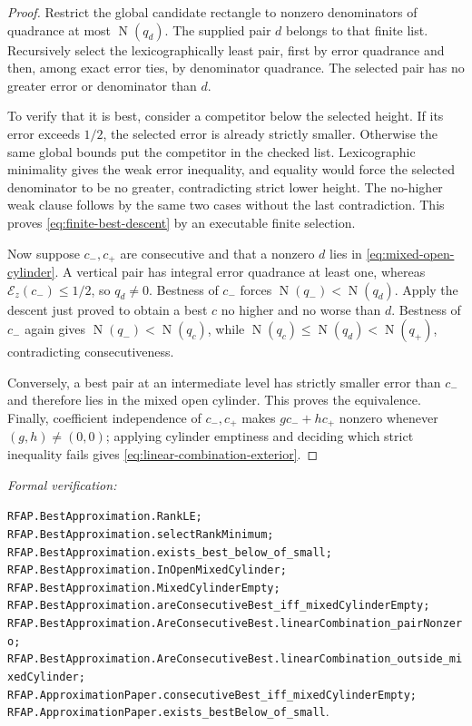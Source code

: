 \documentclass[11pt]{article}
\newcommand{\Norm}[1]{\operatorname{N}\!\left(#1\right)}
\newcommand{\leanref}[1]{\par\smallskip\noindent
  \emph{Formal verification:}\par\nobreak
  {\raggedright\nolinkurl{#1}.\par}}
\begin{document}
\begin{proof}
Restrict the global candidate rectangle to nonzero denominators of quadrance
at most $\Norm{q_d}$.  The supplied pair $d$ belongs to that finite list.
Recursively select the lexicographically least pair, first by error quadrance
and then, among exact error ties, by denominator quadrance.  The selected pair
has no greater error or denominator than $d$.

To verify that it is best, consider a competitor below the selected height.
If its error exceeds $1/2$, the selected error is already strictly smaller.
Otherwise the same global bounds put the competitor in the checked list.
Lexicographic minimality gives the weak error inequality, and equality would
force the selected denominator to be no greater, contradicting strict lower
height.  The no-higher weak clause follows by the same two cases without the
last contradiction.  This proves \eqref{eq:finite-best-descent} by an
executable finite selection.

Now suppose $c_-,c_+$ are consecutive and that a nonzero $d$ lies in
\eqref{eq:mixed-open-cylinder}.  A vertical pair has integral error quadrance
at least one, whereas $\mathcal E_z(c_-)\le1/2$, so $q_d\ne0$.  Bestness of
$c_-$ forces $\Norm{q_-}<\Norm{q_d}$.  Apply the descent just proved to obtain
a best $c$ no higher and no worse than $d$.  Bestness of $c_-$ again gives
$\Norm{q_-}<\Norm{q_c}$, while
$\Norm{q_c}\le\Norm{q_d}<\Norm{q_+}$, contradicting consecutiveness.

Conversely, a best pair at an intermediate level has strictly smaller error
than $c_-$ and therefore lies in the mixed open cylinder.  This proves the
equivalence.  Finally, coefficient independence of $c_-,c_+$ makes
$gc_-+hc_+$ nonzero whenever $(g,h)\ne(0,0)$; applying cylinder emptiness and
deciding which strict inequality fails gives
\eqref{eq:linear-combination-exterior}.
\end{proof}

\leanref{RFAP.BestApproximation.RankLE;
RFAP.BestApproximation.selectRankMinimum;
RFAP.BestApproximation.exists_best_below_of_small;
RFAP.BestApproximation.InOpenMixedCylinder;
RFAP.BestApproximation.MixedCylinderEmpty;
RFAP.BestApproximation.areConsecutiveBest_iff_mixedCylinderEmpty;
RFAP.BestApproximation.AreConsecutiveBest.linearCombination_pairNonzero;
RFAP.BestApproximation.AreConsecutiveBest.linearCombination_outside_mixedCylinder;
RFAP.ApproximationPaper.consecutiveBest_iff_mixedCylinderEmpty;
RFAP.ApproximationPaper.exists_bestBelow_of_small}
\end{document}
